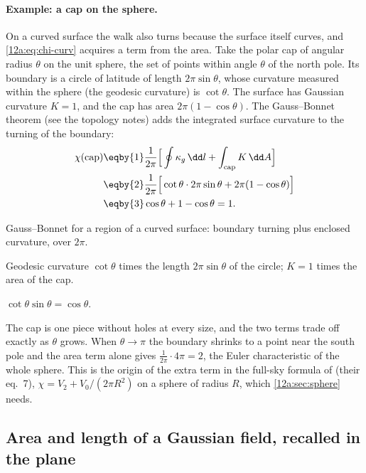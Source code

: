 \paragraph{Example: a cap on the sphere.} On a curved surface the walk also turns because the surface itself
curves, and \eqref{12a:eq:chi-curv} acquires a term from the area. Take the polar cap of angular radius
$\theta$ on the unit sphere, the set of points within angle $\theta$ of the north pole. Its boundary is a
circle of latitude of length $2\pi\sin\theta$, whose curvature measured within the sphere (the geodesic
curvature) is $\cot\theta$. The surface has Gaussian curvature $K=1$, and the cap has area
$2\pi(1-\cos\theta)$. The Gauss--Bonnet theorem (see the topology notes) adds the integrated surface curvature
to the turning of the boundary:
\begin{align}
  \chi(\text{cap})
  &\eqby{1}\frac{1}{2\pi}\Big[\oint\kappa_g\,\dd l+\int_{\rm cap}K\,\dd A\Big]\nonumber\\
  &\eqby{2}\frac{1}{2\pi}\Big[\cot\theta\cdot2\pi\sin\theta+2\pi(1-\cos\theta)\Big]\nonumber\\
  &\eqby{3}\cos\theta+1-\cos\theta=1 .
  \label{12a:eq:cap}
\end{align}
\begin{explain}
  \item Gauss--Bonnet for a region of a curved surface: boundary turning plus enclosed curvature, over
        $2\pi$.
  \item Geodesic curvature $\cot\theta$ times the length $2\pi\sin\theta$ of the circle; $K=1$ times the area
        of the cap.
  \item $\cot\theta\sin\theta=\cos\theta$.
\end{explain}
The cap is one piece without holes at every size, and the two terms trade off exactly as $\theta$ grows. When
$\theta\to\pi$ the boundary shrinks to a point near the south pole and the area term alone gives
$\frac{1}{2\pi}\cdot4\pi=2$, the Euler characteristic of the whole sphere. This is the origin of the extra
term in the full-sky formula of \cite{SchmalzingGorski1998} (their eq.~7), $\chi=V_2+V_0/(2\pi R^2)$ on a
sphere of radius $R$, which \cref{12a:sec:sphere} needs.

\subsection{Area and length of a Gaussian field, recalled in the plane}
\label{12a:sec:area-length}

